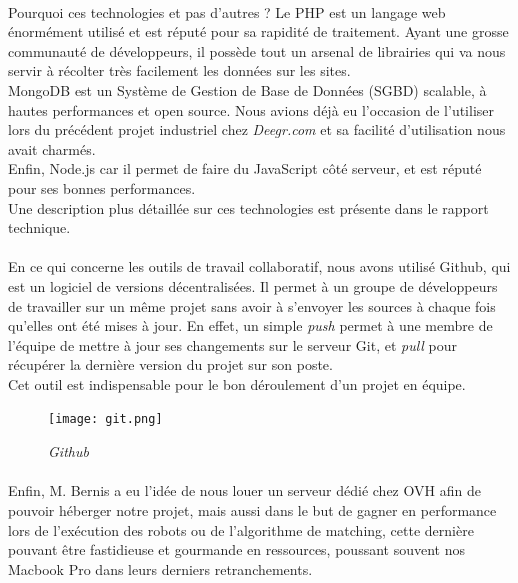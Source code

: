 \documentclass{report}
\begin{document}
\paragraph{}
Pourquoi ces technologies et pas d'autres ? Le PHP est un langage web énormément utilisé et est réputé pour sa rapidité de traitement. Ayant une grosse communauté de développeurs, il possède tout un arsenal de librairies qui va nous servir à récolter très facilement les données sur les sites. \\MongoDB est un Système de Gestion de Base de Données (SGBD) scalable, à hautes performances et open source. Nous avions déjà eu l'occasion de l'utiliser lors du précédent projet industriel chez \textit{Deegr.com} et sa facilité d'utilisation nous avait charmés.\\Enfin, Node.js car il permet de faire du JavaScript côté serveur, et est réputé pour ses bonnes performances.\\
Une description plus détaillée sur ces technologies est présente dans le rapport technique.

\paragraph{}
En ce qui concerne les outils de travail collaboratif, nous avons utilisé Github, qui est un logiciel de versions décentralisées. Il permet à un groupe de développeurs de travailler sur un même projet sans avoir à s'envoyer les sources à chaque fois qu'elles ont été mises à jour. En effet, un simple \textit{push} permet à une membre de l'équipe de mettre à jour ses changements sur le serveur Git, et \textit{pull} pour récupérer la dernière version du projet sur son poste.\\
Cet outil est indispensable pour le bon déroulement d'un projet en équipe.

\begin{figure}[H]
\begin{center}
\texttt{[image: git.png]}
\caption{\textit{Github}}
\end{center}
\end{figure}

\paragraph{}
Enfin, M. Bernis a eu l'idée de nous louer un serveur dédié chez OVH afin de pouvoir héberger notre projet, mais aussi dans le but de gagner en performance lors de l'exécution des robots ou de l'algorithme de matching, cette dernière pouvant être fastidieuse et gourmande en ressources, poussant souvent nos Macbook Pro dans leurs derniers retranchements.
\end{document}
